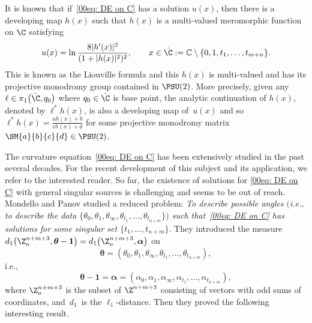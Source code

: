 It is known that if~\eqref{00eq: DE on C} has a solution $u(x)$, then
there is a developing map $h(x)$ such that $h(x)$ is a multi-valued meromorphic
function on $\C$ satisfying
\begin{equation*}%
 u(x)=\ln\frac{8|h'(x)|^2}{(1+|h(x)|^2)^2},\qquad x\in
 \dot{\C}:=\mathbb{C}\setminus\{0,1,t_1,\dots,t_{m+n}\}.
\end{equation*}
This is known as the Liouville formula and this $h(x)$ is multi-valued
and has its projective monodromy group contained in $\PSU(2)$. More
precisely, given any $\ell\in \pi_1\bigl(\dot{\C}, q_0\bigr)$ where
$q_0\in\dot{\C}$ is base point, the analytic continuation of $h(x)$,
denoted by $\ell^*h(x)$, is also a developing map of~$u(x)$ and so
$\ell^*h(x)=\frac{ah(x)+b}{ch(x)+d}$ for some projective monodromy
matrix $\SM{a}{b}{c}{d}\in\PSU(2)$.

The curvature equation~\eqref{00eq: DE on C} has been extensively
studied in the past several decades. For the recent development of
this subject and its application, we refer
\cite{Chai-Lin-Wang,Chen-Lin-weight2,
 Chen-Lin-rectangular,Chen-Lin-Green-function,Chen-Lin-Yang,
Eremenko,Coaxial,EGT,Quadrilateral,Guo-Lin-Yang,
 Lin-Wang-bubbling,Luo-Tian,Mondello-Panov,Mondello-Panov2}
to the interested reader. So far, the existence of solutions for
\eqref{00eq: DE on C} with general singular sources is challenging
and seems to be out of reach.
Mondello and Panov \cite{Mondello-Panov} studied a reduced
problem: \emph{To describe possible angles $($i.e., to describe the data
 $\{\theta_0,
 \theta_1,\theta_\infty,\theta_{t_1},\dots,\theta_{t_{n+m}}\})$ such
 that~\eqref{00eq: DE on C} has solutions for some singular set
 $\{t_1,\dots,t_{n+m}\}$}.
They introduced the measure
$d_1\bigl(\Z_o^{n+m+3},{\boldsymbol\theta-\boldsymbol
 1}\bigr)=d_1\bigl(\Z_o^{n+m+3},{\boldsymbol\alpha}\bigr)$ on
\[
 \boldsymbol \theta=(\theta_0,\theta_1,\theta_\infty,\theta_{t_1},
 \dots,\theta_{t_{n+m}}),
\]
i.e.,
\[
 \boldsymbol\theta-\boldsymbol 1={\boldsymbol\alpha}
 =(\alpha_0,\alpha_1,\alpha_\infty,\alpha_{t_1},\dots,
 \alpha_{t_{n+m}}),
\]
where $\Z_o^{n+m+3}$ is the subset of $\Z^{n+m+3}$ consisting of
vectors with odd sums of coordinates, and~$d_1$~is the
$\ell_1$-distance. Then they proved the following interesting result.

